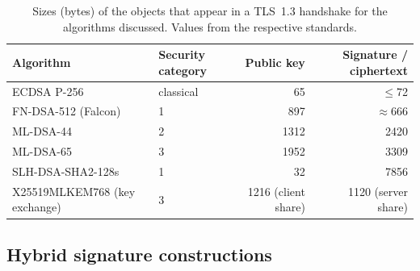 \documentclass[preprint,10pt,3p]{elsarticle}
\begin{document}
\begin{table}[t]
\centering
\caption{Sizes (bytes) of the objects that appear in a TLS~1.3 handshake
  for the algorithms discussed.  Values from the respective standards.}
\label{tab:sizes}
\small
\begin{tabular}{llrr}
\toprule
\textbf{Algorithm} & \textbf{Security category} & \textbf{Public key} &
  \textbf{Signature / ciphertext} \\
\midrule
ECDSA P-256            & classical & 65   & $\le$72 \\
FN-DSA-512 (Falcon)    & 1         & 897  & $\approx$666 \\
ML-DSA-44              & 2         & 1312 & 2420 \\
ML-DSA-65              & 3         & 1952 & 3309 \\
SLH-DSA-SHA2-128s      & 1         & 32   & 7856 \\
\midrule
X25519MLKEM768 (key exchange) & 3  & 1216 (client share) & 1120 (server share) \\
\bottomrule
\end{tabular}
\end{table}

\subsection{Hybrid signature constructions}
\label{sec:hybrid_constructions}
\end{document}
